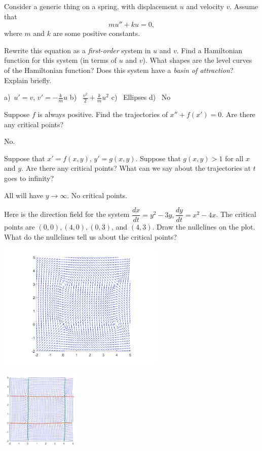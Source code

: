 \begin{exercise} Consider a generic thing on a spring, with displacement $u$ and velocity $v$. Assume that $$mu''+ku=0,$$ where $m$ and $k$ are some positive constants.
\begin{tasks}
\task Rewrite this equation as a {\it first-order} system in $u$ and $v$.
\task Find a Hamiltonian function for this system (in terms of $u$ and $v$).
\task What shapes are the level curves of the Hamiltonian function? 
\task Does this system have a {\it basin of attraction}? Explain briefly. 
\end{tasks}
\end{exercise}
\comboSol{%
}
{%
a)~$u' = v$, $v'= -\frac{k}{m}u$ \quad b)~ $\frac{v^2}{2} + \frac{k}{m}u^2$ \quad c)~ Ellipses \quad d)~ No
}

\begin{exercise}
Suppose $f$ is always positive.
Find the trajectories of $x''+f(x') = 0$.
Are there any critical points?
\end{exercise}
\comboSol{%
}
{%
No.
}

\begin{exercise}
Suppose that $x' = f(x,y)$, $y' = g(x,y)$.  Suppose that $g(x,y) > 1$ for
all $x$ and $y$.  Are there any critical points?  What can we say about the
trajectories at $t$ goes to infinity?
\end{exercise}
\comboSol{%
}
{%
All will have $y\rightarrow \infty$. No critical points.
}

\begin{exercise}
Here is the direction field for the system $\dfrac{dx}{dt}=y^2-3y, \dfrac{dy}{dt}=x^2-4x$. The critical points are $(0,0), (4,0), (0,3)$, and $(4,3)$. Draw the nullclines on the plot. What do the nullclines tell us about the critical points?

\begin{center}
\includegraphics[width=0.6\textwidth]{Images/NLVF_1.png}
\end{center}
\end{exercise}
\comboSol{%
}
{%

\includegraphics[width=1.5in]{Images/NLVF_1_Soln.png}
}

